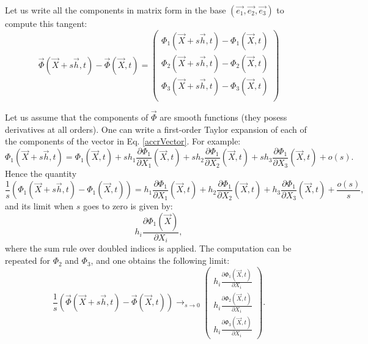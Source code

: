 \documentclass[DIV=12]{article}
\newcommand{\eBase}{(\vec{e_1}, \vec{e_2},\vec{e_3})}
\begin{document}
Let us write all the components in matrix form in the base $\eBase$
to compute this tangent:
\begin{equation}
\vec{\Phi}(\vec{X}+ s\vec{h},t) -  \vec{\Phi}(\vec{X},t) =   \left(
   \begin{array}{l}
       \Phi_1(\vec{X}+ s\vec{h},t) - \Phi_1(\vec{X},t)\\
      \Phi_2(\vec{X}+ s\vec{h},t) - \Phi_2(\vec{X},t)  \\
       \Phi_3(\vec{X}+ s\vec{h},t) - \Phi_3(\vec{X},t)\\
   \end{array}
   \right)
\label{accrVector}
\end{equation}

Let us assume that the components of $\vec{\Phi}$ are smooth functions (they posess
derivatives at all orders). One can write a first-order Taylor expansion 
 of each of the  components of the vector in Eq. \ref{accrVector}. For example:
\begin{equation}
 \Phi_1(\vec{X}+ s\vec{h},t)  = \Phi_1(\vec{X},t) + s h_1 \frac{\partial\Phi_1}{\partial X_1}(\vec{X},t) + s h_2 \frac{\partial\Phi_1}{\partial X_2}(\vec{X},t)+
   s h_3 \frac{\partial\Phi_1}{\partial X_3}(\vec{X},t) + o(s).
\end{equation}
Hence the quantity 
\begin{equation}
 \frac{1}{s}\left(\Phi_1(\vec{X}+ s\vec{h},t)  - \Phi_1(\vec{X},t) \right) =  h_1 \frac{\partial\Phi_1}{\partial X_1}(\vec{X},t) +  h_2 \frac{\partial\Phi_1}{\partial X_2}(\vec{X},t)+
   h_3 \frac{\partial\Phi_1}{\partial X_3}(\vec{X},t) + \frac{o(s)}{s},
\end{equation}
 and its limit when $s$ goes to zero is given by:
\begin{equation}
h_i \frac{\partial \Phi_1( \vec{X})}{\partial X_i},
\end{equation}
 where the sum rule over doubled indices is applied.
 The computation can be repeated for $\Phi_2$ and $\Phi_3$, and one obtains the following limit:
\begin{equation}
\frac{1}{s}\left(
\vec{\Phi}(\vec{X}+ s\vec{h},t) -  \vec{\Phi}(\vec{X},t)\right) \longrightarrow_{s\rightarrow 0}   \left(
   \begin{array}{l}
      h_i \frac{\partial \Phi_1( \vec{X},t)}{\partial X_i}\\
     h_i \frac{\partial \Phi_2( \vec{X},t)}{\partial X_i}\\
     h_i \frac{\partial \Phi_3( \vec{X},t)}{\partial X_i}
   \end{array}
 \right).
\end{equation}
\end{document}
